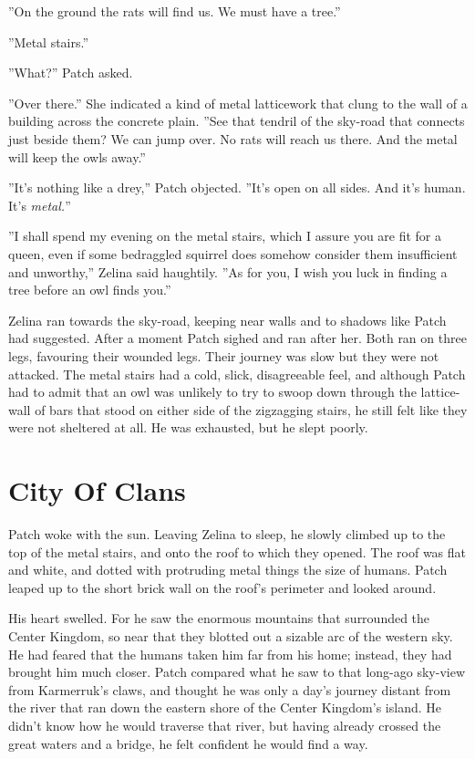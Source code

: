 \documentclass[12pt]{book}
\begin{document}
''On the ground the rats will find us. We must have a tree.''

''Metal stairs.''

''What?'' Patch asked.

''Over there.'' She indicated a kind of metal latticework that clung
to the wall of a building across the concrete plain. ''See that
tendril of the sky-road that connects just beside them? We can jump
over. No rats will reach us there. And the metal will keep the owls
away.''

''It's nothing like a drey,'' Patch objected. ''It's open on all
sides. And it's human. It's \textit{metal.}''

''I shall spend my evening on the metal stairs, which I assure you are
fit for a queen, even if some bedraggled squirrel does somehow
consider them insufficient and unworthy,'' Zelina said haughtily. ''As
for you, I wish you luck in finding a tree before an owl finds you.''

Zelina ran towards the sky-road, keeping near walls and to shadows
like Patch had suggested. After a moment Patch sighed and ran after
her. Both ran on three legs, favouring their wounded legs. Their
journey was slow but they were not attacked. The metal stairs had a
cold, slick, disagreeable feel, and although Patch had to admit that
an owl was unlikely to try to swoop down through the lattice-wall of
bars that stood on either side of the zigzagging stairs, he still felt
like they were not sheltered at all. He was exhausted, but he slept
poorly.


\section{City Of Clans}

Patch woke with the sun. Leaving Zelina to sleep, he slowly climbed up
to the top of the metal stairs, and onto the roof to which they
opened. The roof was flat and white, and dotted with protruding metal
things the size of humans. Patch leaped up to the short brick wall on
the roof's perimeter and looked around.

His heart swelled. For he saw the enormous mountains that surrounded
the Center Kingdom, so near that they blotted out a sizable arc of the
western sky. He had feared that the humans taken him far from his
home; instead, they had brought him much closer. Patch compared what
he saw to that long-ago sky-view from Karmerruk's claws, and thought
he was only a day's journey distant from the river that ran down the
eastern shore of the Center Kingdom's island. He didn't know how he
would traverse that river, but having already crossed the great waters
and a bridge, he felt confident he would find a way.
\end{document}
